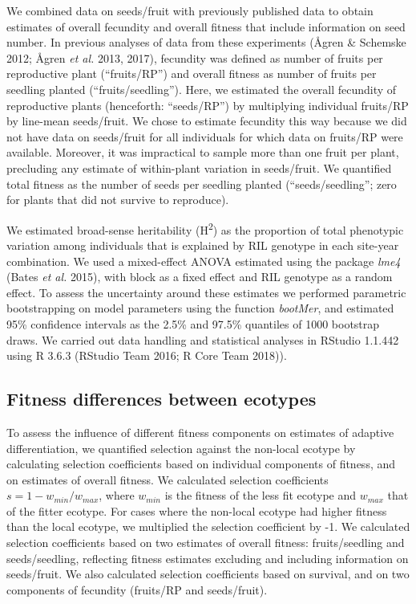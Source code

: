 \documentclass[]{article}
\begin{document}
We combined data on seeds/fruit with previously published data to obtain estimates of overall fecundity and overall fitness that include information on seed number. In previous analyses of data from these experiments (Ågren \& Schemske 2012; Ågren \emph{et al.} 2013, 2017), fecundity was defined as number of fruits per reproductive plant (``fruits/RP'') and overall fitness as number of fruits per seedling planted (``fruits/seedling''). Here, we estimated the overall fecundity of reproductive plants (henceforth: ``seeds/RP'') by multiplying individual fruits/RP by line-mean seeds/fruit. We chose to estimate fecundity this way because we did not have data on seeds/fruit for all individuals for which data on fruits/RP were available. Moreover, it was impractical to sample more than one fruit per plant, precluding any estimate of within-plant variation in seeds/fruit. We quantified total fitness as the number of seeds per seedling planted (``seeds/seedling''; zero for plants that did not survive to reproduce).

We estimated broad-sense heritability (H\textsuperscript{2}) as the proportion of total phenotypic variation among individuals that is explained by RIL genotype in each site-year combination. We used a mixed-effect ANOVA estimated using the package \emph{lme4} (Bates \emph{et al.} 2015), with block as a fixed effect and RIL genotype as a random effect. To assess the uncertainty around these estimates we performed parametric bootstrapping on model parameters using the function \emph{bootMer}, and estimated 95\% confidence intervals as the 2.5\% and 97.5\% quantiles of 1000 bootstrap draws. We carried out data handling and statistical analyses in RStudio 1.1.442 using R 3.6.3 (RStudio Team 2016; R Core Team 2018)).

\hypertarget{fitness-differences-between-ecotypes}{%
\subsection{Fitness differences between ecotypes}\label{fitness-differences-between-ecotypes}}

To assess the influence of different fitness components on estimates of adaptive differentiation, we quantified selection against the non-local ecotype by calculating selection coefficients based on individual components of fitness, and on estimates of overall fitness. We calculated selection coefficients \(s=1-w_{min}/w_{max}\), where \(w_{min}\) is the fitness of the less fit ecotype and \(w_{max}\) that of the fitter ecotype. For cases where the non-local ecotype had higher fitness than the local ecotype, we multiplied the selection coefficient by -1. We calculated selection coefficients based on two estimates of overall fitness: fruits/seedling and seeds/seedling, reflecting fitness estimates excluding and including information on seeds/fruit. We also calculated selection coefficients based on survival, and on two components of fecundity (fruits/RP and seeds/fruit).
\end{document}
